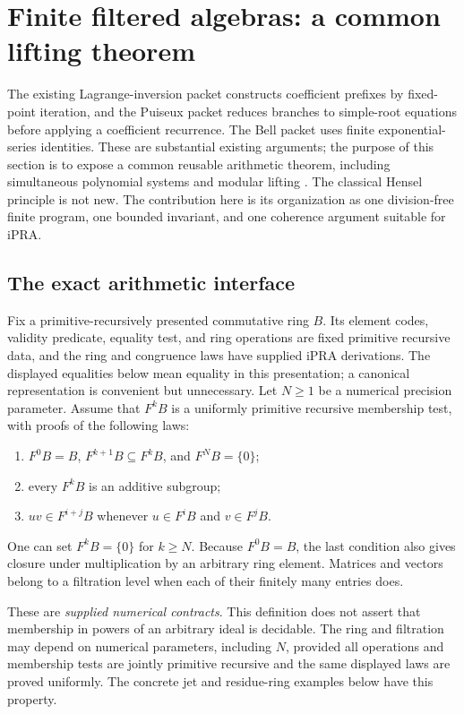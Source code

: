 \section{Finite filtered algebras: a common lifting theorem}
\label{sec:filtered-lifting}

The existing Lagrange-inversion packet constructs coefficient prefixes by
fixed-point iteration, and the Puiseux packet reduces branches to simple-root
equations before applying a coefficient recurrence.  The Bell packet uses
finite exponential-series identities.  These are substantial existing
arguments; the purpose of this section is to expose a common reusable
arithmetic theorem, including simultaneous polynomial systems and modular
lifting \cite{repoLagrange,repoPuiseux,repoBell}. The classical Hensel principle is not new. The contribution here
is its organization as one division-free finite program, one bounded
invariant, and one coherence argument suitable for iPRA.

\subsection{The exact arithmetic interface}

Fix a primitive-recursively presented commutative ring $B$.  Its element
codes, validity predicate, equality test, and ring operations are fixed
primitive recursive data, and the ring and congruence laws have supplied
iPRA derivations.  The displayed equalities below mean equality in this
presentation; a canonical representation is convenient but unnecessary.
Let $N\ge1$ be a numerical precision parameter.  Assume that
$F^kB$ is a uniformly primitive recursive membership test, with proofs of
the following laws:
\begin{enumerate}
\item $F^0B=B$, $F^{k+1}B\subseteq F^kB$, and $F^NB=\{0\}$;
\item every $F^kB$ is an additive subgroup;
\item $uv\in F^{i+j}B$ whenever $u\in F^iB$ and $v\in F^jB$.
\end{enumerate}
One can set $F^kB=\{0\}$ for $k\ge N$.  Because $F^0B=B$, the last
condition also gives closure under multiplication by an arbitrary ring
element.  Matrices and vectors belong to a filtration level when each of
their finitely many entries does.

These are \emph{supplied numerical contracts}.  This definition does not
assert that membership in powers of an arbitrary ideal is decidable.
The ring and filtration may depend on numerical parameters, including
$N$, provided all operations and membership tests are jointly primitive
recursive and the same displayed laws are proved uniformly.  The concrete
jet and residue-ring examples below have this property.


